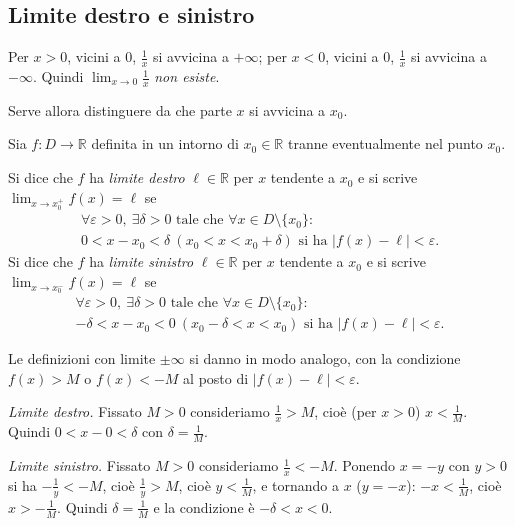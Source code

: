 \documentclass[11pt,a4paper]{article}
\begin{document}
\subsection{Limite destro e sinistro}

\begin{esempio}[$f(x) = \frac{1}{x}$ non ha limite per $x \to 0$]
Per $x > 0$, vicini a $0$, $\frac{1}{x}$ si avvicina a $+\infty$; per $x < 0$, vicini a $0$, $\frac{1}{x}$ si avvicina a $-\infty$. Quindi $\displaystyle\lim_{x\to 0}\frac{1}{x}$ \emph{non esiste}.
\end{esempio}

Serve allora distinguere da che parte $x$ si avvicina a $x_0$.

\begin{definizione}
Sia $f : D \to \mathbb{R}$ definita in un intorno di $x_0 \in \mathbb{R}$ tranne eventualmente nel punto $x_0$.

Si dice che $f$ ha \emph{limite destro} $\ell \in \mathbb{R}$ per $x$ tendente a $x_0$ e si scrive $\displaystyle\lim_{x\to x_0^+} f(x) = \ell$ se
\begin{gather*}
\forall \varepsilon > 0,\ \exists \delta > 0 \text{ tale che } \forall x \in D \setminus \{x_0\} : \\ 0 < x - x_0 < \delta \ (x_0 < x < x_0 + \delta) \text{ si ha } |f(x) - \ell| < \varepsilon .
\end{gather*}
Si dice che $f$ ha \emph{limite sinistro} $\ell \in \mathbb{R}$ per $x$ tendente a $x_0$ e si scrive $\displaystyle\lim_{x\to x_0^-} f(x) = \ell$ se
\begin{gather*}
\forall \varepsilon > 0,\ \exists \delta > 0 \text{ tale che } \forall x \in D \setminus \{x_0\} : \\ -\delta < x - x_0 < 0 \ (x_0 - \delta < x < x_0) \text{ si ha } |f(x) - \ell| < \varepsilon .
\end{gather*}
\end{definizione}

Le definizioni con limite $\pm\infty$ si danno in modo analogo, con la condizione $f(x) > M$ o $f(x) < -M$ al posto di $|f(x) - \ell| < \varepsilon$.

\begin{esempio}[$\lim_{x\to 0^+}\frac{1}{x} = +\infty$ e $\lim_{x\to 0^-}\frac{1}{x} = -\infty$]
\emph{Limite destro.} Fissato $M > 0$ consideriamo $\frac{1}{x} > M$, cioè (per $x > 0$) $x < \frac{1}{M}$. Quindi $0 < x - 0 < \delta$ con $\delta = \frac{1}{M}$.

\emph{Limite sinistro.} Fissato $M > 0$ consideriamo $\frac{1}{x} < -M$. Ponendo $x = -y$ con $y > 0$ si ha $-\frac{1}{y} < -M$, cioè $\frac{1}{y} > M$, cioè $y < \frac{1}{M}$, e tornando a $x$ ($y = -x$): $-x < \frac{1}{M}$, cioè $x > -\frac{1}{M}$. Quindi $\delta = \frac{1}{M}$ e la condizione è $-\delta < x < 0$.
\end{esempio}
\end{document}
